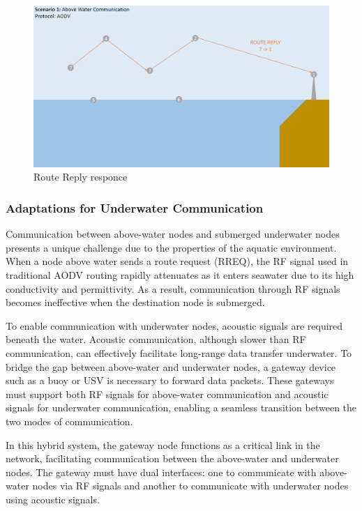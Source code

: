 \documentclass[]{nsm-thesis}
\begin{document}
\begin{figure}[h]
\graphicspath{{/image/}} %
\centering
\includegraphics[scale=0.5]{image/Scenario1_2.png} %
\caption{Route Reply responce}
\label{fig:mesh8} %
\end{figure}
\clearpage

\subsubsection{Adaptations for Underwater Communication}
Communication between above-water nodes and submerged underwater nodes presents a unique challenge due to the properties of the aquatic environment. When a node above water sends a route request (RREQ), the RF signal used in traditional AODV routing rapidly attenuates as it enters seawater due to its high conductivity and permittivity. As a result, communication through RF signals becomes ineffective when the destination node is submerged.

To enable communication with underwater nodes, acoustic signals are required beneath the water. Acoustic communication, although slower than RF communication, can effectively facilitate long-range data transfer underwater. To bridge the gap between above-water and underwater nodes, a gateway device such as a buoy or USV is necessary to forward data packets. These gateways must support both RF signals for above-water communication and acoustic signals for underwater communication, enabling a seamless transition between the two modes of communication.

In this hybrid system, the gateway node functions as a critical link in the network, facilitating communication between the above-water and underwater nodes. The gateway must have dual interfaces: one to communicate with above-water nodes via RF signals and another to communicate with underwater nodes using acoustic signals.
\end{document}

